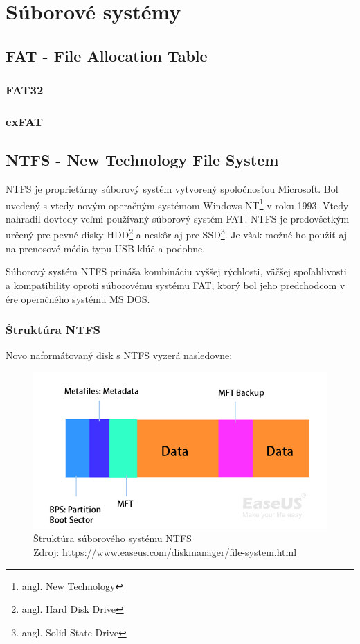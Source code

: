 \documentclass[12pt,oneside,slovak,a4paper]{article}
\begin{document}
\section{Súborové systémy}
\subsection{FAT - File Allocation Table}
\subsubsection{FAT32}
\subsubsection{exFAT}
\subsection{NTFS - New Technology File System}
NTFS je proprietárny súborový systém vytvorený spoločnosťou Microsoft. Bol uvedený s vtedy novým operačným systémom Windows NT\footnote{angl. New Technology} v roku 1993. Vtedy nahradil dovtedy veľmi používaný súborový systém FAT. NTFS je predovšetkým určený pre pevné disky HDD\footnote{angl. Hard Disk Drive} a neskôr aj pre SSD\footnote{angl. Solid State Drive}. Je však možné ho použiť aj na prenosové média typu USB kľúč a podobne. 


Súborový systém NTFS prináša kombináciu vyššej rýchlosti, väčšej spoľahlivosti a kompatibility oproti súborovému systému FAT, ktorý bol jeho predchodcom v ére operačného systému MS DOS.
\subsubsection{Štruktúra NTFS}
Novo naformátovaný disk s NTFS vyzerá nasledovne:

\begin{figure}[H]
\centering
\captionsetup{justification=centering,margin=2cm}
\includegraphics[width=\linewidth]{ntfs-file-system-structure.png}
\centering
\caption{Štruktúra súborového systému NTFS \\ Zdroj: https://www.easeus.com/diskmanager/file-system.html}
\end{figure}
\end{document}
